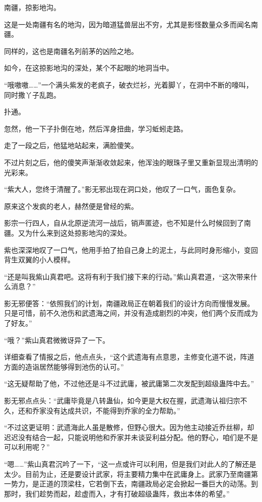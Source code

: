 \begin{this_body}
南疆，掠影地沟。

这是一处南疆有名的地沟，因为暗道猛兽层出不穷，尤其是影怪数量众多而闻名南疆。

同样的，这也是南疆名列前茅的凶险之地。

如今，在这掠影地沟的深处，某个不起眼的地洞当中。

“哦嗷嗷……”一个满头紫发的老疯子，破衣烂衫，光着脚丫，在洞中不断的嚎叫，同时撒丫子乱跑。

扑通。

忽然，他一下子扑倒在地，然后浑身扭曲，学习蚯蚓走路。

走了一段之后，他猛地站起来，满脸傻笑。

不过片刻之后，他的傻笑声渐渐收敛起来，他浑浊的眼珠子里又重新显现出清明的光彩来。

“紫大人，您终于清醒了。”影无邪出现在洞口处，他叹了一口气，面色复杂。

原来这个发疯的老人，赫然便是曾经的紫。

影宗一行四人，自从北原逆流河一战后，销声匿迹，也不知是什么时候回到了南疆。又为什么来到这处掠影地沟的深处。

紫也深深地叹了一口气，他用手拍了拍自己身上的泥土，与此同时身形缩小，变回背生双翼的小人模样。

“还是叫我紫山真君吧。这将有利于我们接下来的行动。”紫山真君道，“这次带来什么消息？”

影无邪便答：“依照我们的计划，南疆政局正在朝着我们的设计方向而慢慢发展。只是可惜，前不久池伤和武遗海之间，并没有造成剧烈的冲突，他们两个反而成为了好友。”

“哦？”紫山真君微微讶异了一下。

详细查看了情报之后，他点点头，“这个武遗海有点意思，主修变化道不说，阵道方面的造诣居然能够得到池伤的认可。”

“这无疑帮助了他，不过他还是斗不过武庸，被武庸第二次发配到超级蛊阵中去。”

影无邪点点头：“武庸毕竟是八转蛊仙，如今更是大权在握，武遗海认祖归宗不久，还和乔家没有达成共识，不能得到乔家的全力帮助。”

“不过这更证明：武遗海此人虽是散修，但野心很大。因为他主动接近乔丝柳，却迟迟没有结合一起，只能说明他和乔家并未谈妥利益分配。他的野心，咱们是不是可以利用呢？”

“嗯……”紫山真君沉吟了一下，“这一点或许可以利用，但是我们对此人的了解还是太少。目前为止，还是要设计武家，将主要精力集中在武庸身上。武家乃至南疆第一势力，是正道的顶梁柱，它若倒下去，南疆政局必定会掀起一番巨大的动荡。到那时，我们趁势而起，趁虚而入，才有打破超级蛊阵，救出本体的希望。”


\end{this_body}
